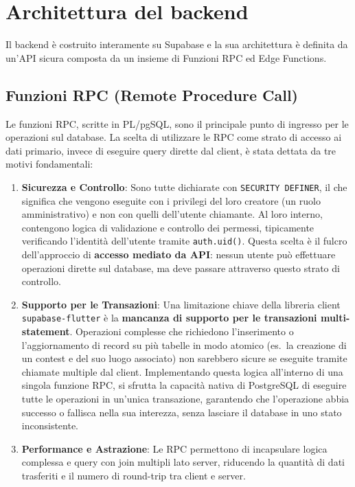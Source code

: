 \newpage

\section{Architettura del backend}\label{sec:architettura-del-backend}
Il backend è costruito interamente su Supabase e la sua architettura è definita da un'API sicura composta da un insieme di Funzioni RPC ed Edge Functions.

\subsection{Funzioni RPC (Remote Procedure Call)}\label{subsec:funzioni-rpc-(remote-procedure-call)}
Le funzioni RPC, scritte in PL/pgSQL, sono il principale punto di ingresso per le operazioni sul database.
La scelta di utilizzare le RPC come strato di accesso ai dati primario, invece di eseguire query dirette dal client, è stata dettata da tre motivi fondamentali:

\begin{enumerate}
    \item \textbf{Sicurezza e Controllo}: Sono tutte dichiarate con \texttt{SECURITY DEFINER}, il che significa che vengono eseguite con i privilegi del loro creatore (un ruolo amministrativo) e non con quelli dell'utente chiamante.
    Al loro interno, contengono logica di validazione e controllo dei permessi, tipicamente verificando l'identità dell'utente tramite \texttt{auth.uid()}.
    Questa scelta è il fulcro dell'approccio di \textbf{accesso mediato da API}: nessun utente può effettuare operazioni dirette sul database, ma deve passare attraverso questo strato di controllo.

    \item \textbf{Supporto per le Transazioni}: Una limitazione chiave della libreria client \texttt{supabase-flutter} è la \textbf{mancanza di supporto per le transazioni multi-statement}.
    Operazioni complesse che richiedono l'inserimento o l'aggiornamento di record su più tabelle in modo atomico (es.\ la creazione di un contest e del suo luogo associato) non sarebbero sicure se eseguite tramite chiamate multiple dal client.
    Implementando questa logica all'interno di una singola funzione RPC, si sfrutta la capacità nativa di PostgreSQL di eseguire tutte le operazioni in un'unica transazione, garantendo che l'operazione abbia successo o fallisca nella sua interezza, senza lasciare il database in uno stato inconsistente.

    \item \textbf{Performance e Astrazione}: Le RPC permettono di incapsulare logica complessa e query con join multipli lato server, riducendo la quantità di dati trasferiti e il numero di round-trip tra client e server.
\end{enumerate}

